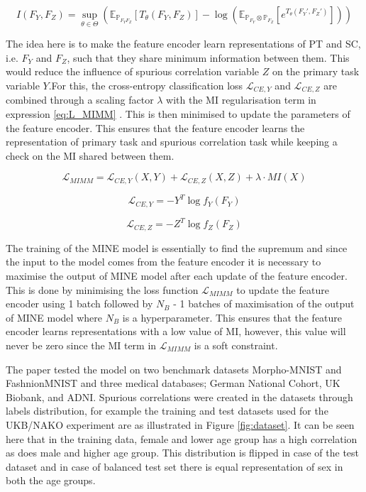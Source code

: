 \documentclass[12pt,DIV14,BCOR12mm,a4paper,footinclude=false,headinclude,parskip=half-,twoside,openright,cleardoublepage=empty,toc=index,bibliography=totoc,listof=totoc]{scrreprt}
\numberwithin{equation}{chapter}
\begin{document}
\begin{equation}\label{eq:DV_MI_features}
    I(F_Y,F_Z) =  \sup_{\theta \in \Theta} \left( \mathbb{E}_{\mathbb{P}_{F_{Y}F_{Z}}}[T_{\theta}(F_Y,F_Z)] - \log(\mathbb{E}_{\mathbb{P}_{F_Y} \otimes
 \mathbb{P}_{F_Z}}[e^{T_{\theta}(F_Y',F_Z')}]) \right)
\end{equation}

The idea here is to make the feature encoder learn representations of PT and SC, i.e. $F_Y$ and $F_Z$, such that they share minimum information between them. This would reduce the influence of spurious correlation variable $Z$ on the primary task variable $Y$.For this, the cross-entropy classification loss $\mathcal{L}_{CE,Y}$ and $\mathcal{L}_{CE, Z}$ are combined through a scaling factor $\lambda$ with the MI regularisation term in expression \ref{eq:L_MIMM} \cite{10162210}. This is then minimised to update the parameters of the feature encoder. This ensures that the feature encoder learns the representation of primary task and spurious correlation task while keeping a check on the MI shared between them. 

\begin{equation}\label{eq:L_MIMM}
 \mathcal{L}_{MIMM} = \mathcal{L}_{CE, Y}(X,Y) + \mathcal{L}_{CE, Z}(X,Z) + \lambda \cdot MI(X)
\end{equation}

\begin{equation}\label{eq:L_CE,Y}
 \mathcal{L}_{CE,Y} = -Y^T \log f_Y(F_Y)
\end{equation}

\begin{equation}\label{eq:L_CE,Z}
 \mathcal{L}_{CE,Z} = -Z^T \log f_Z(F_Z)
\end{equation}

The training of the MINE model is essentially to find the supremum and since the input to the model comes from the feature encoder it is necessary to maximise the output of MINE model after each update of the feature encoder. This is done by minimising the loss function $\mathcal{L}_{MIMM}$ to update the feature encoder using 1 batch followed by $N_B$ - 1 batches of maximisation of the output of MINE model where $N_B$ is a hyperparameter.  This ensures that the feature encoder learns representations with a low value of MI, however, this value will never be zero since the MI term in $\mathcal{L}_{MIMM}$ is a soft constraint.

The paper tested the model on two benchmark datasets Morpho-MNIST and FashnionMNIST and three medical databases; German National Cohort, UK Biobank, and ADNI. Spurious correlations were created in the datasets through labels distribution, for example the training and test datasets used for the UKB/NAKO experiment are as illustrated in Figure \ref{fig:dataset}. It can be seen here that in the training data, female and lower age group has a high correlation as does male and higher age group. This distribution is flipped in case of the test dataset and in case of balanced test set there is equal representation of sex in both the age groups.  
\end{document}

